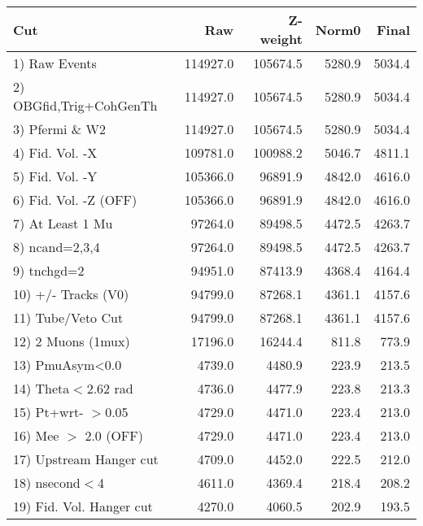  \begin{table}[h!]\centering
 \begin{tabular}{||l||r|r|r|r||}
 \hline
 \hline
 Cut & Raw & Z-weight & Norm0 & Final \\
 \hline
  1) Raw Events           &    114927.0 &    105674.5 &      5280.9 &      5034.4 \\
  2) OBGfid,Trig+CohGenTh &    114927.0 &    105674.5 &      5280.9 &      5034.4 \\
  3) Pfermi \& W2         &    114927.0 &    105674.5 &      5280.9 &      5034.4 \\
  4) Fid. Vol. -X         &    109781.0 &    100988.2 &      5046.7 &      4811.1 \\
  5) Fid. Vol. -Y         &    105366.0 &     96891.9 &      4842.0 &      4616.0 \\
  6) Fid. Vol. -Z (OFF)   &    105366.0 &     96891.9 &      4842.0 &      4616.0 \\
  7) At Least 1 Mu        &     97264.0 &     89498.5 &      4472.5 &      4263.7 \\
  8) ncand=2,3,4          &     97264.0 &     89498.5 &      4472.5 &      4263.7 \\
  9) tnchgd=2             &     94951.0 &     87413.9 &      4368.4 &      4164.4 \\
 10) +/- Tracks (V0)      &     94799.0 &     87268.1 &      4361.1 &      4157.6 \\
 11) Tube/Veto Cut        &     94799.0 &     87268.1 &      4361.1 &      4157.6 \\
 12) 2 Muons (1mux)       &     17196.0 &     16244.4 &       811.8 &       773.9 \\
 13) PmuAsym<0.0          &      4739.0 &      4480.9 &       223.9 &       213.5 \\
 14) Theta$<$2.62 rad     &      4736.0 &      4477.9 &       223.8 &       213.3 \\
 15) Pt+wrt- $>$0.05      &      4729.0 &      4471.0 &       223.4 &       213.0 \\
 16) Mee $>$ 2.0  (OFF)   &      4729.0 &      4471.0 &       223.4 &       213.0 \\
 17) Upstream Hanger cut  &      4709.0 &      4452.0 &       222.5 &       212.0 \\
 18) nsecond$<$4          &      4611.0 &      4369.4 &       218.4 &       208.2 \\
 19) Fid. Vol. Hanger cut &      4270.0 &      4060.5 &       202.9 &       193.5 \\

\end{tabular}
\end{table}
